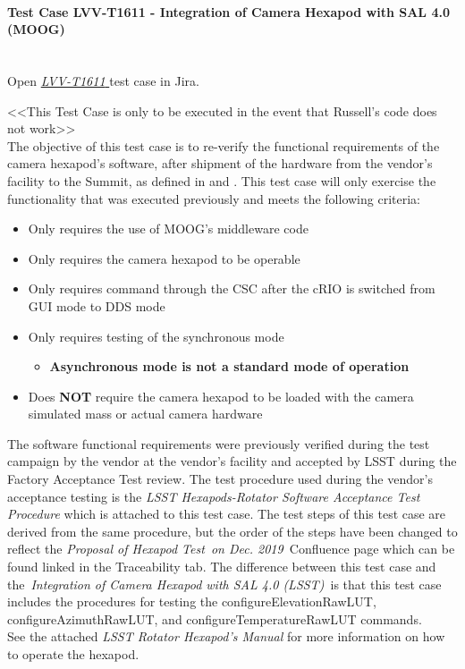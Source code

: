 \documentclass[SE,lsstdraft,STR,toc]{lsstdoc}
\providecommand{\tightlist}{
  \setlength{\itemsep}{0pt}\setlength{\parskip}{0pt}}
\begin{document}
\paragraph{Test Case LVV-T1611 - Integration of Camera Hexapod with SAL 4.0 (MOOG) }\mbox{}\\

Open  \href{https://jira.lsstcorp.org/secure/Tests.jspa#/testCase/LVV-T1611}{\textit{ LVV-T1611 } }
test case in Jira.

{\textless{}\textless{}This Test Case is only to be executed in the
event that Russell's code does not work\textgreater{}\textgreater{}}\\
The objective of this test case is to re-verify the functional
requirements of the camera hexapod's software, after shipment of the
hardware from the vendor's facility to the Summit, as defined in 
and . This test case will only exercise the functionality that
was executed previously and meets the following criteria:

\begin{itemize}
\tightlist
\item
  Only requires the use of MOOG's middleware code
\item
  Only requires the camera hexapod to be operable
\item
  Only requires command through the CSC after the cRIO is switched from
  GUI mode to DDS mode
\item
  Only requires testing of the synchronous mode

  \begin{itemize}
  \tightlist
  \item
    \textbf{Asynchronous mode is not a standard mode of operation}
  \end{itemize}
\item
  Does \textbf{NOT} require the camera hexapod to be loaded with the
  camera simulated mass or actual camera hardware
\end{itemize}

The software functional requirements were previously verified during the
test campaign by the vendor at the vendor's facility and accepted by
LSST during the Factory Acceptance Test review. The test procedure used
during the vendor's acceptance testing is the \emph{LSST
Hexapods-Rotator Software Acceptance Test Procedure} which is attached
to this test case. The test steps of this test case are derived from the
same procedure, but the order of the steps have been changed to reflect
the \emph{Proposal of Hexapod Test~on Dec. 2019~}Confluence page which
can be found linked in the Traceability tab. The difference between this
test case and the~\emph{Integration of Camera Hexapod with SAL 4.0
(LSST)~}is that this test case includes the procedures for testing the
configureElevationRawLUT, configureAzimuthRawLUT, and
configureTemperatureRawLUT commands.\\[2\baselineskip]See the attached
\emph{LSST Rotator Hexapod's Manual} for more information on how to
operate the hexapod.
\end{document}
